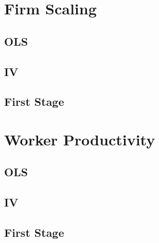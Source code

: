 \documentclass{article}
\newcommand{\resultsdir}{../results}
\begin{document}
\section{Firm Scaling}

\subsection{OLS}


\subsection{IV}


\subsection{First Stage}


\section{Worker Productivity}

\subsection{OLS}


\subsection{IV}


\subsection{First Stage}

\end{document}
